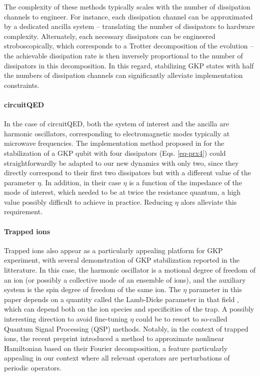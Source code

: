 \documentclass[a4paper, 11pt]{article}
\begin{document}
The complexity of these methods typically scales with the number of dissipation channels to engineer. For instance, each dissipation channel can be approximated by a dedicated ancilla system -- translating the number of dissipators to hardware complexity. Alternately, each necessary dissipators can be engineered stroboscopically, which corresponds to a Trotter decomposition of the evolution -- the achievable dissipation rate is then inversely proportional to the number of dissipators in this decomposition.
In this regard, stabilizing GKP states with half the numbers of dissipation channels can significantly alleviate implementation constraints.
\paragraph{circuitQED}
In the case of circuitQED, both the system of interest and the ancilla are harmonic oscillators, corresponding to electromagnetic modes typically at microwave frequencies. The implementation method proposed in \cite{sellemDissipativeProtectionGKP2025} for the stabilization of a GKP qubit with four dissipators (Eqs. \ref{eq-prx4}) could straightforwardly be adapted to our new dynamics with only two, since they directly correspond to their first two dissipators but with a different value of the parameter $\eta$. 
In addition, in their case $\eta$ is a function of the impedance of the mode of interest, which needed to be at twice the resistance quantum, a high value possibly  difficult to achieve in practice. Reducing $\eta$ alors alleviate this requirement.

\paragraph{Trapped ions}
Trapped ions also appear as a particularly appealing platform for GKP experiment, with several demonstration of GKP stabilization reported in the litterature. In this case, the harmonic oscillator is a motional degree of freedom of an ion (or possibly a collective mode of an ensemble of ions), and the auxiliary system is the spin degree of freedom of the same ion. 
The $\eta$ parameter in this paper depends on a quantity called the Lamb-Dicke parameter in that field \cite{winelandExperimentalIssuesCoherent1998}, which can depend both on the ion species and specificities of the trap.
A possibly interesting direction to avoid fine-tuning $\eta$ could be to resort to so-called Quantum Signal Processing (QSP) methods. Notably, in the context of trapped ions, the recent preprint \cite{mcgarryProgrammableQuantumSimulation2026} introduced a method to approximate nonlinear Hamiltonian based on their Fourier decomposition, a feature particularly appealing in our context where all relevant operators are perturbations of periodic operators.
\end{document}
